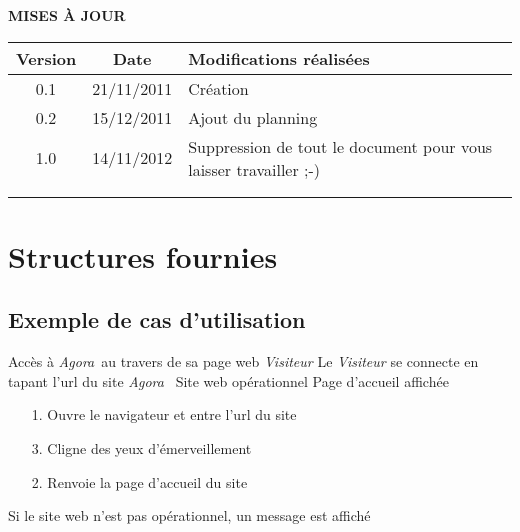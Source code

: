 \documentclass[a4paper,11pt,french]{article}
\def\projectName{\emph{Agora}~}
\begin{document}
\makeFirstPage
\clearpage

\vspace*{1cm}
\begin{center}
\textbf{\huge{MISES À JOUR}}\\
\vspace*{3cm}
	\begin{tabularx}{16cm}{|c|c|X|}
	\hline
	\bfseries{Version} & \bfseries{Date} & \bfseries{Modifications réalisées}\\
	\hline
	0.1 & 21/11/2011 & Création\\
	\hline
	0.2 & 15/12/2011 & Ajout du planning\\
	\hline
	 1.0 & 14/11/2012 & Suppression de tout le document pour vous laisser travailler ;-)\\
	\hline
	&&\\
	\hline
	&&\\
	\hline
	\end{tabularx}
\end{center}

\clearpage
\tableofcontents
\clearpage

\section{Structures fournies}
\subsection{Exemple de cas d'utilisation}


\fiche
	{Accès à \projectName au travers de sa page web } %
	{\emph{Visiteur}} %
	{Le \emph{Visiteur} se connecte en tapant l'url du site \projectName} %
	{Site web opérationnel} %
	{} %
	{Page d'accueil affichée} %
	{\begin{itemize}  %
		\item [1.] Ouvre le navigateur et entre l'url du site
		\item[]
		\item [3.]  Cligne des yeux d'émerveillement
	 \end{itemize}
	} 
	{\begin{itemize}  %
		\item []
		\item [2.] Renvoie la page d'accueil du site
	 \end{itemize}
	 }
	{Si le site web n'est pas opérationnel, un message est affiché} %
\end{document}
